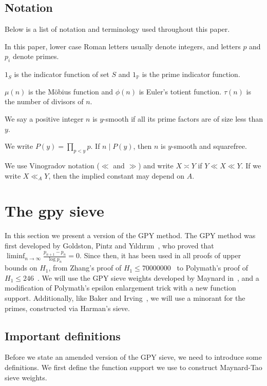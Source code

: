 \documentclass{amsart}
\numberwithin{equation}{section}
\begin{document}
\subsection{Notation}  Below is a list of notation and terminology used throughout this paper.



\medskip
In this paper, lower case Roman letters  usually denote integers, and letters $p$ and $p_i$ denote primes.

 $1_S$ is the indicator function of set $S$ and  $1_{\mathbb{P}}$ is the prime indicator function. 

 $\mu(n)$ is the Möbius function and $\phi(n)$ is Euler's totient function.  $\tau(n)$ is the number of divisors of $n$.

\medskip
We say a positive integer $n $ is  $y$-smooth if all its prime factors are of size less than $y$. 

We write $P(y)= \prod_{p <y} p$. If $n \mid P(y)$, then $n$ is $y$-smooth and squarefree.

 
 \medskip
 We   use Vinogradov  notation ($\ll$ and $\gg$) and write $X \asymp Y$ if $Y \ll X \ll Y$. If we write $X \ll_A Y$, then the implied constant may depend on $A$.  

\section{The gpy sieve }\label{sec:gpysummary}


In this section we present a version of the GPY method. The GPY method was first developed by Goldston, Pintz and Yıldırım~\cite{Goldston:2009:PTI}, who proved that $\liminf_{n \rightarrow \infty} \frac{p_{n+1}-p_n}{\log p_n}=0$. Since then, it has been used in all proofs of upper bounds on $H_1$, from Zhang's proof of $H_1 \leq 70000000$~\cite{Zhang:2015:BGP} to Polymath's proof of $H_1 \leq 246$~\cite{Polymath:2014:VSS}. We will use the GPY sieve weights developed by Maynard in~\cite{Maynard:2015:SGP}, and a modification of   Polymath's epsilon enlargement trick with a new function support. Additionally, like Baker and Irving~\cite{Baker:2017:BIP}, we will use a minorant for the primes, constructed via Harman's sieve.


\subsection{Important definitions}

 Before we   state an amended version of the GPY sieve, we need to introduce some   definitions. We first define the function support we  use  to construct   Maynard-Tao sieve weights.
 
\end{document}
